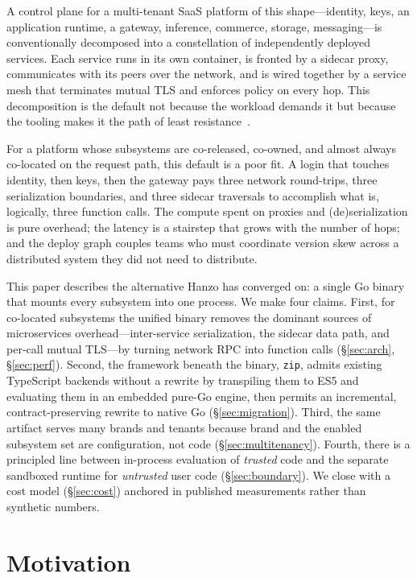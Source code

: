 \documentclass[11pt]{article}
\begin{document}
A control plane for a multi-tenant SaaS platform of this shape---identity,
keys, an application runtime, a gateway, inference, commerce, storage,
messaging---is conventionally decomposed into a constellation of
independently deployed services. Each service runs in its own container,
is fronted by a sidecar proxy, communicates with its peers over the
network, and is wired together by a service mesh that terminates mutual
TLS and enforces policy on every hop. This decomposition is the default
not because the workload demands it but because the tooling makes it the
path of least resistance~\cite{fowler_microservices}.

For a platform whose subsystems are co-released, co-owned, and almost
always co-located on the request path, this default is a poor fit. A login
that touches identity, then keys, then the gateway pays three network
round-trips, three serialization boundaries, and three sidecar traversals
to accomplish what is, logically, three function calls. The compute spent
on proxies and (de)serialization is pure overhead; the latency is a
stairstep that grows with the number of hops; and the deploy graph couples
teams who must coordinate version skew across a distributed system they did
not need to distribute.

This paper describes the alternative Hanzo has converged on: a single Go
binary that mounts every subsystem into one process. We make four claims.
First, for co-located subsystems the unified binary removes the dominant
sources of microservices overhead---inter-service serialization, the
sidecar data path, and per-call mutual TLS---by turning network RPC into
function calls (\S\ref{sec:arch}, \S\ref{sec:perf}). Second, the framework
beneath the binary, \texttt{zip}, admits existing TypeScript backends
without a rewrite by transpiling them to ES5 and evaluating them in an
embedded pure-Go engine, then permits an incremental, contract-preserving
rewrite to native Go (\S\ref{sec:migration}). Third, the same artifact
serves many brands and tenants because brand and the enabled subsystem set
are configuration, not code (\S\ref{sec:multitenancy}). Fourth, there is a
principled line between in-process evaluation of \emph{trusted} code and
the separate sandboxed runtime for \emph{untrusted} user code
(\S\ref{sec:boundary}). We close with a cost model
(\S\ref{sec:cost}) anchored in published measurements rather than
synthetic numbers.

\section{Motivation}
\label{sec:motivation}
\end{document}
